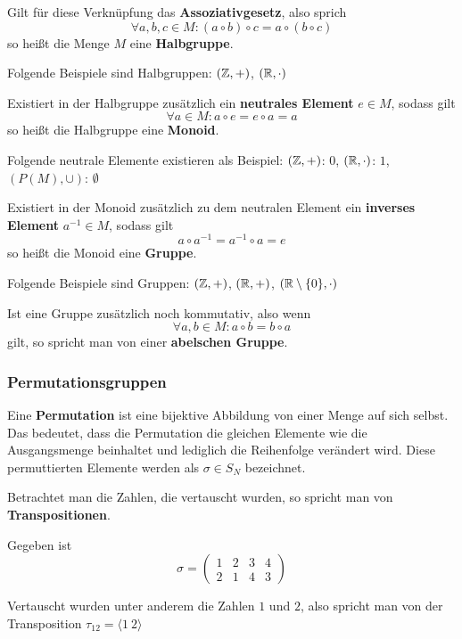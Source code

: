 \documentclass[11pt]{article}
\begin{document}
Gilt für diese Verknüpfung das \textbf{Assoziativgesetz}, also sprich
\[
  \forall a, b, c \in M: (a \circ b) \circ c = a \circ (b \circ c)
\]
so heißt die Menge $M$ eine \textbf{Halbgruppe}.
\begin{bsp}
  Folgende Beispiele sind Halbgruppen:
  $(\mathbb{Z}, +)$,
  $(\mathbb{R}, \cdot)$
\end{bsp}

Existiert in der Halbgruppe zusätzlich ein \textbf{neutrales Element} $e \in M$, sodass gilt
\[
  \forall a \in M: a \circ e = e \circ a = a
\]
so heißt die Halbgruppe eine \textbf{Monoid}.
\begin{bsp}
  Folgende neutrale Elemente existieren als Beispiel:
  $(\mathbb{Z}, +)$: $0$,
  $(\mathbb{R}, \cdot)$: $1$,
  $(P(M), \cup)$: $\emptyset$
\end{bsp}

Existiert in der Monoid zusätzlich zu dem neutralen Element ein \textbf{inverses Element} $a^{-1} \in M$, sodass gilt
\[
  a \circ a^{-1} = a^{-1} \circ a = e
\]
so heißt die Monoid eine \textbf{Gruppe}.

\begin{bsp}
  Folgende Beispiele sind Gruppen:
  $(\mathbb{Z}, +)$,
  $(\mathbb{R}, +)$,
  $(\mathbb{R}\setminus\{0\}, \cdot)$
\end{bsp}

\begin{anmk}
  Ist eine Gruppe zusätzlich noch kommutativ, also wenn
  \[
    \forall a, b \in M: a \circ b = b \circ a
  \]
  gilt, so spricht man von einer \textbf{abelschen Gruppe}.
\end{anmk}

\subsubsection{Permutationsgruppen}
Eine \textbf{Permutation} ist eine bijektive Abbildung von einer Menge auf sich selbst. Das bedeutet, dass die Permutation
die gleichen Elemente wie die Ausgangsmenge beinhaltet und lediglich die Reihenfolge verändert wird. Diese permuttierten
Elemente werden als $\sigma \in S_N$ bezeichnet.

Betrachtet man die Zahlen, die vertauscht wurden, so spricht man von \textbf{Transpositionen}.
\begin{bsp}
  Gegeben ist
  \[
    \sigma = \begin{pmatrix}
      1 & 2 & 3 & 4 \\
      2 & 1 & 4 & 3
    \end{pmatrix}
  \]

  Vertauscht wurden unter anderem die Zahlen $1$ und $2$, also spricht man von der Transposition $\tau_{12} = \langle1~2\rangle$
\end{bsp}
\end{document}
